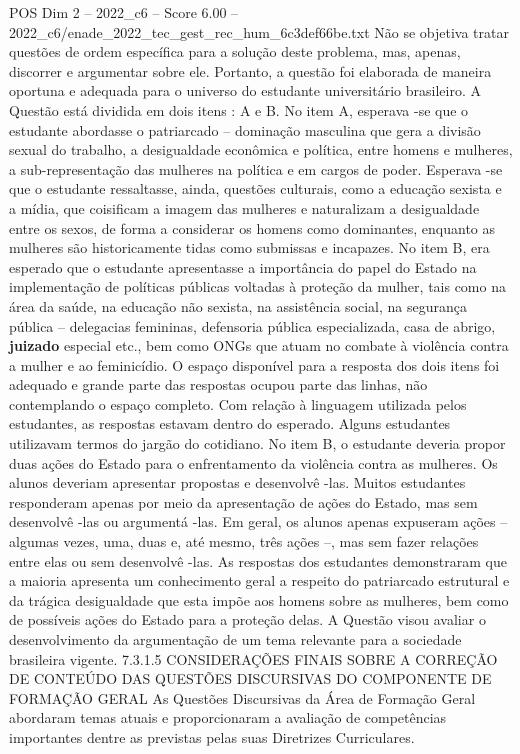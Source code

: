 \begin{textsample}{POS Dim 2 – 2022\_c6 – Score 6.00 – 2022\_c6/enade\_2022\_tec\_gest\_rec\_hum\_6c3def66be.txt}
Não se objetiva tratar questões de ordem específica para a solução deste problema, mas, apenas, discorrer e argumentar sobre ele.
Portanto, a questão foi elaborada de maneira oportuna e adequada para o universo do estudante universitário brasileiro.
A Questão está dividida em dois itens : A e B.
No item A, esperava -se que o estudante abordasse o patriarcado – dominação masculina que gera a divisão sexual do trabalho, a desigualdade econômica e política, entre homens e mulheres, a sub-representação das mulheres na política e em cargos de poder.
Esperava -se que o estudante ressaltasse, ainda, questões culturais, como a educação sexista e a mídia, que coisificam a imagem das mulheres e naturalizam a desigualdade entre os sexos, de forma a considerar os homens como dominantes, enquanto as mulheres são historicamente tidas como submissas e incapazes.
No item B, era esperado que o estudante apresentasse a importância do papel do Estado na implementação de políticas públicas voltadas à proteção da mulher, tais como na área da saúde, na educação não sexista, na assistência social, na segurança pública – delegacias femininas, defensoria pública especializada, casa de abrigo, \textbf{juizado} especial etc., bem como ONGs que atuam no combate à violência contra a mulher e ao feminicídio.
O espaço disponível para a resposta dos dois itens foi adequado e grande parte das respostas ocupou parte das linhas, não contemplando o espaço completo.
Com relação à linguagem utilizada pelos estudantes, as respostas estavam dentro do esperado.
Alguns estudantes utilizavam termos do jargão do cotidiano.
No item B, o estudante deveria propor duas ações do Estado para o enfrentamento da violência contra as mulheres.
Os alunos deveriam apresentar propostas e desenvolvê -las.
Muitos estudantes responderam apenas por meio da apresentação de ações do Estado, mas sem desenvolvê -las ou argumentá -las.
Em geral, os alunos apenas expuseram ações – algumas vezes, uma, duas e, até mesmo, três ações –, mas sem fazer relações entre elas ou sem desenvolvê -las.
As respostas dos estudantes demonstraram que a maioria apresenta um conhecimento geral a respeito do patriarcado estrutural e da trágica desigualdade que esta impõe aos homens sobre as mulheres, bem como de possíveis ações do Estado para a proteção delas.
A Questão visou avaliar o desenvolvimento da argumentação de um tema relevante para a sociedade brasileira vigente. 7.3.1.5 CONSIDERAÇÕES FINAIS SOBRE A CORREÇÃO DE CONTEÚDO DAS QUESTÕES DISCURSIVAS DO COMPONENTE DE FORMAÇÃO GERAL As Questões Discursivas da Área de Formação Geral abordaram temas atuais e proporcionaram a avaliação de competências importantes dentre as previstas pelas suas Diretrizes Curriculares.

\end{textsample}
